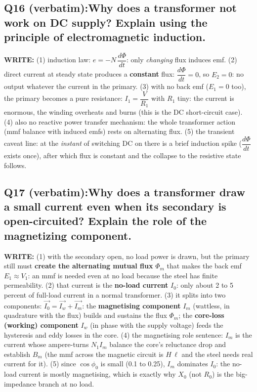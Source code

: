 \documentclass[11pt]{article}
\newcommand{\q}[2]{\subsection*{\color{copper}#1\quad\color{iron}#2}}
\newcommand{\w}[1]{\textbf{\color{copper}WRITE:} #1}
\begin{document}
\q{Q16 (verbatim):}{Why does a transformer not work on DC supply? Explain using the principle of electromagnetic induction.}
\w{(1) induction law: $e = -N\,\dfrac{d\Phi}{dt}$: only \emph{changing} flux induces emf. (2) direct current at steady state produces a \textbf{constant} flux: $\dfrac{d\Phi}{dt} = 0$, so $E_2 = 0$: no output whatever the current in the primary. (3) with no back emf ($E_1 = 0$ too), the primary becomes a pure resistance: $I_1 = \dfrac{V}{R_1}$ with $R_1$ tiny: the current is enormous, the winding overheats and burns (this is the DC short-circuit case). (4) also no reactive power transfer mechanism: the whole transformer action (mmf balance with induced emfs) rests on alternating flux. (5) the transient caveat line: at the \emph{instant} of switching DC on there is a brief induction spike ($\dfrac{d\Phi}{dt}$ exists once), after which flux is constant and the collapse to the resistive state follows.}

\q{Q17 (verbatim):}{Why does a transformer draw a small current even when its secondary is open-circuited? Explain the role of the magnetizing component.}
\w{(1) with the secondary open, no load power is drawn, but the primary still must \textbf{create the alternating mutual flux} $\Phi_m$ that makes the back emf $E_1 \approx V_1$: an mmf is needed even at no load because the steel has finite permeability. (2) that current is the \textbf{no-load current} $I_0$: only about 2 to 5 percent of full-load current in a normal transformer. (3) it splits into two components: $\vec{I_0} = \vec{I_w} + \vec{I_m}$: the \textbf{magnetising component} $I_m$ (wattless, in quadrature with the flux) builds and sustains the flux $\Phi_m$; the \textbf{core-loss (working) component} $I_w$ (in phase with the supply voltage) feeds the hysteresis and eddy losses in the core. (4) the magnetising role sentence: $I_m$ is the current whose ampere-turns $N_1 I_m$ balance the core's reluctance drop and establish $B_m$ (the mmf across the magnetic circuit is $H\, \ell$ and the steel needs real current for it). (5) since $\cos\phi_0$ is small (0.1 to 0.25), $I_m$ dominates $I_0$: the no-load current is mostly magnetising, which is exactly why $X_0$ (not $R_0$) is the big-impedance branch at no load.}
\end{document}
